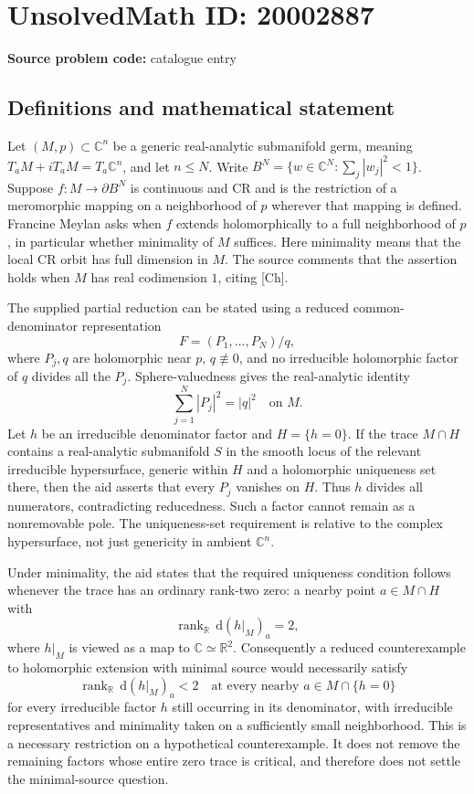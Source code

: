 \documentclass[11pt]{article}
\newcommand{\R}{\mathbb{R}}
\newcommand{\C}{\mathbb{C}}
\newcommand{\dd}{\,\mathrm{d}}
\begin{document}
\section*{UnsolvedMath ID: 20002887}
\textbf{Source problem code:} catalogue entry
\subsection{Definitions and mathematical statement}
Let $(M,p)\subset\C^n$ be a generic real-analytic submanifold germ, meaning $T_aM+iT_aM=T_a\C^n$, and let $n\leq N$. Write $B^N=\{w\in\C^N:\sum_j|w_j|^2<1\}$. Suppose $f:M\to\partial B^N$ is continuous and CR and is the restriction of a meromorphic mapping on a neighborhood of $p$ wherever that mapping is defined. Francine Meylan asks when $f$ extends holomorphically to a full neighborhood of $p$, in particular whether minimality of $M$ suffices. Here minimality means that the local CR orbit has full dimension in $M$. The source comments that the assertion holds when $M$ has real codimension $1$, citing [Ch].

The supplied partial reduction can be stated using a reduced common-denominator representation
\[
F=(P_1,\ldots,P_N)/q,
\]
where $P_j,q$ are holomorphic near $p$, $q\not\equiv0$, and no irreducible holomorphic factor of $q$ divides all the $P_j$. Sphere-valuedness gives the real-analytic identity
\[
\sum_{j=1}^N|P_j|^2=|q|^2\quad\text{on }M.
\]
Let $h$ be an irreducible denominator factor and $H=\{h=0\}$. If the trace $M\cap H$ contains a real-analytic submanifold $S$ in the smooth locus of the relevant irreducible hypersurface, generic within $H$ and a holomorphic uniqueness set there, then the aid asserts that every $P_j$ vanishes on $H$. Thus $h$ divides all numerators, contradicting reducedness. Such a factor cannot remain as a nonremovable pole. The uniqueness-set requirement is relative to the complex hypersurface, not just genericity in ambient $\C^n$.

Under minimality, the aid states that the required uniqueness condition follows whenever the trace has an ordinary rank-two zero: a nearby point $a\in M\cap H$ with
\[
\operatorname{rank}_{\R}\dd(h|_M)_a=2,
\]
where $h|_M$ is viewed as a map to $\C\simeq\R^2$. Consequently a reduced counterexample to holomorphic extension with minimal source would necessarily satisfy
\[
\operatorname{rank}_{\R}\dd(h|_M)_a<2
\quad\text{at every nearby }a\in M\cap\{h=0\}
\]
for every irreducible factor $h$ still occurring in its denominator, with irreducible representatives and minimality taken on a sufficiently small neighborhood. This is a necessary restriction on a hypothetical counterexample. It does not remove the remaining factors whose entire zero trace is critical, and therefore does not settle the minimal-source question.
\end{document}
